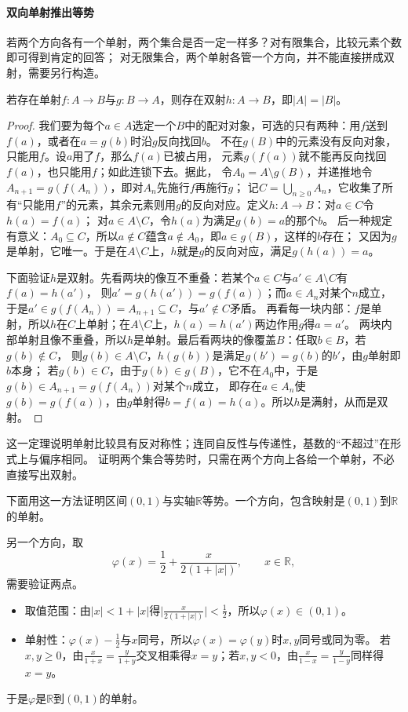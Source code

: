 \paragraph{双向单射推出等势}
若两个方向各有一个单射，两个集合是否一定一样多？对有限集合，比较元素个数即可得到肯定的回答；
对无限集合，两个单射各管一个方向，并不能直接拼成双射，需要另行构造。
\begin{theorem}
\label{thm:comb-cantor-schroeder-bernstein}
若存在单射$f:A\to B$与$g:B\to A$，则存在双射$h:A\to B$，即$|A|=|B|$。
\end{theorem}
\begin{proof}
我们要为每个$a\in A$选定一个$B$中的配对对象，可选的只有两种：用$f$送到$f(a)$，或者在$a=g(b)$时沿$g$反向找回$b$。
不在$g(B)$中的元素没有反向对象，只能用$f$。设$a$用了$f$，那么$f(a)$已被占用，
元素$g(f(a))$就不能再反向找回$f(a)$，也只能用$f$；如此连锁下去。据此，
令$A_0=A\setminus g(B)$，并递推地令$A_{n+1}=g(f(A_n))$，即对$A_n$先施行$f$再施行$g$；
记$C=\bigcup_{n\geq0}A_n$，它收集了所有“只能用$f$”的元素，其余元素则用$g$的反向对应。定义$h:A\to B$：对$a\in C$令$h(a)=f(a)$；
对$a\in A\setminus C$，令$h(a)$为满足$g(b)=a$的那个$b$。
后一种规定有意义：$A_0\subseteq C$，所以$a\notin C$蕴含$a\notin A_0$，即$a\in g(B)$，这样的$b$存在；
又因为$g$是单射，它唯一。于是在$A\setminus C$上，$h$就是$g$的反向对应，满足$g(h(a))=a$。

下面验证$h$是双射。先看两块的像互不重叠：若某个$a\in C$与$a'\in A\setminus C$有$f(a)=h(a')$，
则$a'=g(h(a'))=g(f(a))$；而$a\in A_n$对某个$n$成立，于是$a'\in g(f(A_n))=A_{n+1}\subseteq C$，与$a'\notin C$矛盾。
再看每一块内部：$f$是单射，所以$h$在$C$上单射；在$A\setminus C$上，$h(a)=h(a')$两边作用$g$得$a=a'$。
两块内部单射且像不重叠，所以$h$是单射。最后看两块的像覆盖$B$：任取$b\in B$，若$g(b)\notin C$，
则$g(b)\in A\setminus C$，$h(g(b))$是满足$g(b')=g(b)$的$b'$，由$g$单射即$b$本身；
若$g(b)\in C$，由于$g(b)\in g(B)$，它不在$A_0$中，于是$g(b)\in A_{n+1}=g(f(A_n))$对某个$n$成立，
即存在$a\in A_n$使$g(b)=g(f(a))$，由$g$单射得$b=f(a)=h(a)$。所以$h$是满射，从而是双射。
\end{proof}
这一定理说明单射比较具有反对称性；连同自反性与传递性，基数的“不超过”在形式上与偏序相同。
证明两个集合等势时，只需在两个方向上各给一个单射，不必直接写出双射。

下面用这一方法证明区间$(0,1)$与实轴$\mathbb R$等势。一个方向，包含映射是$(0,1)$到$\mathbb R$的单射。

另一个方向，取
\[
 \varphi(x)=\frac12+\frac{x}{2(1+|x|)},\qquad x\in\mathbb R,
\]
需要验证两点。
\begin{itemize}
 \item 取值范围：由$|x|<1+|x|$得$\bigl|\frac{x}{2(1+|x|)}\bigr|<\frac12$，所以$\varphi(x)\in(0,1)$。
 \item 单射性：$\varphi(x)-\frac12$与$x$同号，所以$\varphi(x)=\varphi(y)$时$x,y$同号或同为零。
       若$x,y\geq0$，由$\frac{x}{1+x}=\frac{y}{1+y}$交叉相乘得$x=y$；若$x,y<0$，由$\frac{x}{1-x}=\frac{y}{1-y}$同样得$x=y$。
\end{itemize}
于是$\varphi$是$\mathbb R$到$(0,1)$的单射。

